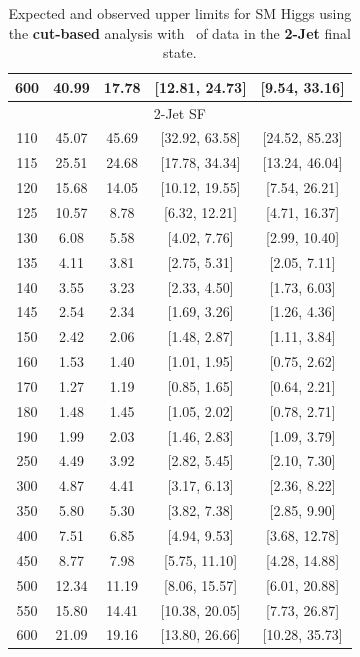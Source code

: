\begin{table}[hbp!]
\begin{center}
\begin{tabular}{c c c c c}
600 & 40.99 & 17.78 & [12.81, 24.73] & [9.54, 33.16] \\
\hline
\multicolumn{5}{c}{2-Jet SF} \\
\hline
110 & 45.07 & 45.69 & [32.92, 63.58] & [24.52, 85.23] \\
115 & 25.51 & 24.68 & [17.78, 34.34] & [13.24, 46.04] \\
120 & 15.68 & 14.05 & [10.12, 19.55] & [7.54, 26.21] \\
125 & 10.57 & 8.78 & [6.32, 12.21] & [4.71, 16.37] \\
130 & 6.08 & 5.58 & [4.02, 7.76] & [2.99, 10.40] \\
135 & 4.11 & 3.81 & [2.75, 5.31] & [2.05, 7.11] \\
140 & 3.55 & 3.23 & [2.33, 4.50] & [1.73, 6.03] \\
145 & 2.54 & 2.34 & [1.69, 3.26] & [1.26, 4.36] \\
150 & 2.42 & 2.06 & [1.48, 2.87] & [1.11, 3.84] \\
160 & 1.53 & 1.40 & [1.01, 1.95] & [0.75, 2.62] \\
170 & 1.27 & 1.19 & [0.85, 1.65] & [0.64, 2.21] \\
180 & 1.48 & 1.45 & [1.05, 2.02] & [0.78, 2.71] \\
190 & 1.99 & 2.03 & [1.46, 2.83] & [1.09, 3.79] \\

250 & 4.49 & 3.92 & [2.82, 5.45] & [2.10, 7.30] \\
300 & 4.87 & 4.41 & [3.17, 6.13] & [2.36, 8.22] \\
350 & 5.80 & 5.30 & [3.82, 7.38] & [2.85, 9.90] \\
400 & 7.51 & 6.85 & [4.94, 9.53] & [3.68, 12.78] \\
450 & 8.77 & 7.98 & [5.75, 11.10] & [4.28, 14.88] \\
500 & 12.34 & 11.19 & [8.06, 15.57] & [6.01, 20.88] \\
550 & 15.80 & 14.41 & [10.38, 20.05] & [7.73, 26.87] \\
600 & 21.09 & 19.16 & [13.80, 26.66] & [10.28, 35.73] \\
\hline
\end{tabular}
\caption{Expected and observed upper limits for SM Higgs using the
  {\bf cut-based} analysis with \intlumiEightTeV\ of data in the {\bf 2-Jet} final state.}
\label{tab:cutbase_uls_2j}
\end{center}
\end{table}

